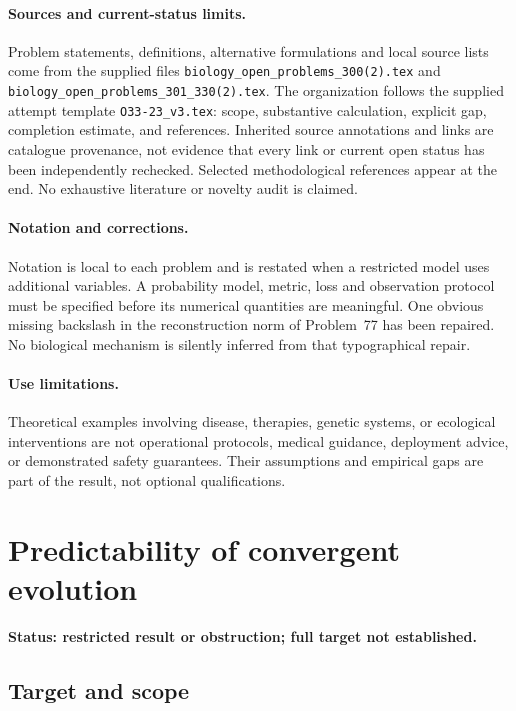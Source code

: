 \documentclass[11pt]{article}
\begin{document}
\paragraph{Sources and current-status limits.}
Problem statements, definitions, alternative formulations and local source lists
come from the supplied files
\texttt{biology\_open\_problems\_300(2).tex} and
\texttt{biology\_open\_problems\_301\_330(2).tex}.
The organization follows the supplied attempt template
\texttt{O33-23\_v3.tex}: scope, substantive calculation, explicit gap,
completion estimate, and references. Inherited source annotations and links are
catalogue provenance, not evidence that every link or current open status has
been independently rechecked. Selected methodological references appear at the
end. No exhaustive literature or novelty audit is claimed.

\paragraph{Notation and corrections.}
Notation is local to each problem and is restated when a restricted model uses
additional variables. A probability model, metric, loss and observation protocol
must be specified before its numerical quantities are meaningful. One obvious
missing backslash in the reconstruction norm of Problem~77 has been repaired.
No biological mechanism is silently inferred from that typographical repair.

\paragraph{Use limitations.}
Theoretical examples involving disease, therapies, genetic systems, or ecological
interventions are not operational protocols, medical guidance, deployment advice,
or demonstrated safety guarantees. Their assumptions and empirical gaps are part
of the result, not optional qualifications.


\section*{Predictability of convergent evolution}
\label{prob:158}
\noindent\textbf{Status: restricted result or obstruction; full target not established.}
\subsection{Target and scope}
\end{document}
